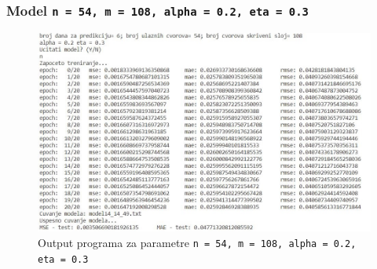 \documentclass[a4paper]{article}
\begin{document}
\pagebreak %
\subsubsection{Model \texttt{n = 54, m = 108, alpha = 0.2, eta = 0.3}}
\begin{figure}[h!]
\begin{center}
\includegraphics[scale=0.9]{output/output_example_program_14_14_49.JPG}
\end{center}
\caption{Output programa za parametre \texttt{n = 54, m = 108, alpha = 0.2, eta = 0.3}}
\end{figure}
\end{document}
